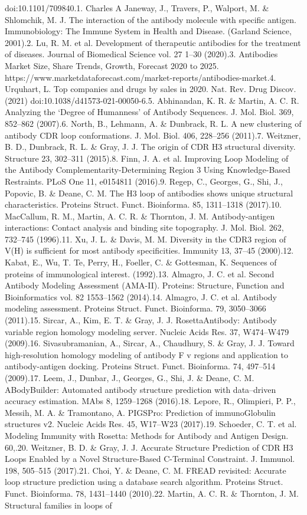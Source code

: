 \documentclass[
]{article}
\begin{document}
{{{doi:10.1101/709840.}{1. Charles A Janeway, J., Travers, P., Walport, M. \& Shlomchik, M. J. The interaction of the antibody molecule with specific antigen. Immunobiology: The Immune System in Health and Disease. (Garland Science, 2001).2. Lu, R. M. et al. Development of therapeutic antibodies for the treatment of diseases. Journal of Biomedical Science vol. 27 1--30 (2020).3. Antibodies Market Size, Share Trends, Growth, Forecast \textbar{} 2020 to 2025. https://www.marketdataforecast.com/market-reports/antibodies-market.4. Urquhart, L. Top companies and drugs by sales in 2020. Nat. Rev. Drug Discov. (2021) doi:10.1038/d41573-021-00050-6.5. Abhinandan, K. R. \& Martin, A. C. R. Analyzing the `Degree of Humanness' of Antibody Sequences. J. Mol. Biol. 369, 852--862 (2007).6. North, B., Lehmann, A. \& Dunbrack, R. L. A new clustering of antibody CDR loop conformations. J. Mol. Biol. 406, 228--256 (2011).7. Weitzner, B. D., Dunbrack, R. L. \& Gray, J. J. The origin of CDR H3 structural diversity. Structure 23, 302--311 (2015).8. Finn, J. A. et al. Improving Loop Modeling of the Antibody Complementarity-Determining Region 3 Using Knowledge-Based Restraints. PLoS One 11, e0154811 (2016).9. Regep, C., Georges, G., Shi, J., Popovic, B. \& Deane, C. M. The H3 loop of antibodies shows unique structural characteristics. Proteins Struct. Funct. Bioinforma. 85, 1311--1318 (2017).10. MacCallum, R. M., Martin, A. C. R. \& Thornton, J. M. Antibody-antigen interactions: Contact analysis and binding site topography. J. Mol. Biol. 262, 732--745 (1996).11. Xu, J. L. \& Davis, M. M. Diversity in the CDR3 region of V(H) is sufficient for most antibody specificities. Immunity 13, 37--45 (2000).12. Kabat, E., Wu, T. Te, Perry, H., Foeller, C. \& Gottesman, K. Sequences of proteins of immunological interest. (1992).13. Almagro, J. C. et al. Second Antibody Modeling Assessment (AMA-II). Proteins: Structure, Function and Bioinformatics vol. 82 1553--1562 (2014).14. Almagro, J. C. et al. Antibody modeling assessment. Proteins Struct. Funct. Bioinforma. 79, 3050--3066 (2011).15. Sircar, A., Kim, E. T. \& Gray, J. J. RosettaAntibody: Antibody variable region homology modeling server. Nucleic Acids Res. 37, W474--W479 (2009).16. Sivasubramanian, A., Sircar, A., Chaudhury, S. \& Gray, J. J. Toward high-resolution homology modeling of antibody F v regions and application to antibody-antigen docking. Proteins Struct. Funct. Bioinforma. 74, 497--514 (2009).17. Leem, J., Dunbar, J., Georges, G., Shi, J. \& Deane, C. M. ABodyBuilder: Automated antibody structure prediction with data--driven accuracy estimation. MAbs 8, 1259--1268 (2016).18. Lepore, R., Olimpieri, P. P., Messih, M. A. \& Tramontano, A. PIGSPro: Prediction of immunoGlobulin structures v2. Nucleic Acids Res. 45, W17--W23 (2017).19. Schoeder, C. T. et al. Modeling Immunity with Rosetta: Methods for Antibody and Antigen Design. 60,.20. Weitzner, B. D. \& Gray, J. J. Accurate Structure Prediction of CDR H3 Loops Enabled by a Novel Structure-Based C-Terminal Constraint. J. Immunol. 198, 505--515 (2017).21. Choi, Y. \& Deane, C. M. FREAD revisited: Accurate loop structure prediction using a database search algorithm. Proteins Struct. Funct. Bioinforma. 78, 1431--1440 (2010).22. Martin, A. C. R. \& Thornton, J. M. Structural families in loops of }}}
\end{document}

